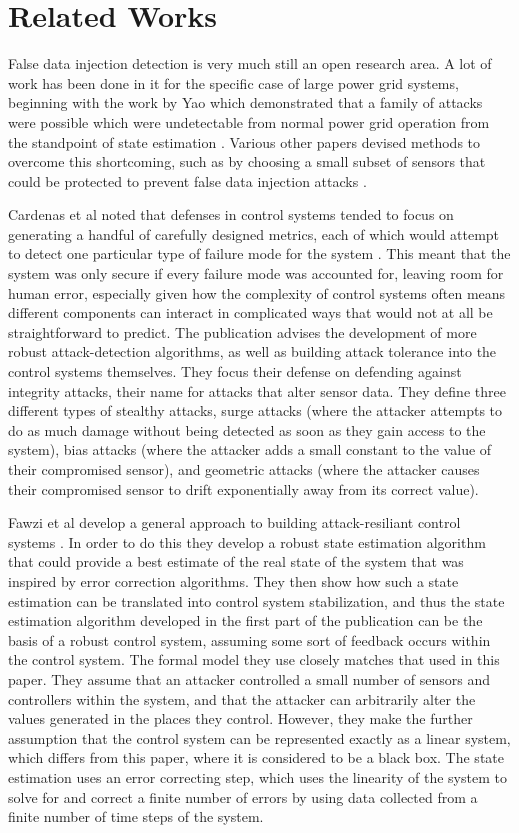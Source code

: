 \documentclass[10pt,twocolumn]{IEEEtran}
\begin{document}
\section{Related Works} \label{sec:related}
False data injection detection is very much still an open research area.
A lot of work has been done in it for the specific case of large power grid systems, beginning with the work by Yao which demonstrated that a family of attacks were possible which were undetectable from normal power grid operation from the standpoint of state estimation \cite{liu2011false}.
Various other papers devised methods to overcome this shortcoming, such as by choosing a small subset of sensors that could be protected to prevent false data injection attacks \cite{bobba2010detecting}.

Cardenas et al noted that defenses in control systems tended to focus on generating a handful of carefully designed metrics, each of which would attempt to detect one particular type of failure mode for the system \cite{attacks}.
This meant that the system was only secure if every failure mode was accounted for, leaving room for human error, especially given how the complexity of control systems often means different components can interact in complicated ways that would not at all be straightforward to predict.
The publication advises the development of more robust attack-detection algorithms, as well as building attack tolerance into the control systems themselves.
They focus their defense on defending against integrity attacks, their name for attacks that alter sensor data.
They define three different types of stealthy attacks, surge attacks (where the attacker attempts to do as much damage without being detected as soon as they gain access to the system), bias attacks (where the attacker adds a small constant to the value of their compromised sensor), and geometric attacks (where the attacker causes their compromised sensor to drift exponentially away from its correct value).

Fawzi et al develop a general approach to building attack-resiliant control systems \cite{secureestimation}.
In order to do this they develop a robust state estimation algorithm that could provide a best estimate of the real state of the system that was inspired by error correction algorithms.
They then show how such a state estimation can be translated into control system stabilization, and thus the state estimation algorithm developed in the first part of the publication can be the basis of a robust control system, assuming some sort of feedback occurs within the control system.
The formal model they use closely matches that used in this paper.
They assume that an attacker controlled a small number of sensors and controllers within the system, and that the attacker can arbitrarily alter the values generated in the places they control.
However, they make the further assumption that the control system can be represented exactly as a linear system, which differs from this paper, where it is considered to be a black box.
The state estimation uses an error correcting step, which uses the linearity of the system to solve for and correct a finite number of errors by using data collected from a finite number of time steps of the system.
\end{document}
